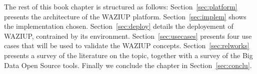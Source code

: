 The rest of this book chapter is structured as follows: Section~\ref{sec:platform} presents the architecture of the WAZIUP platform. 
Section~\ref{sec:implem} shows the implementation chosen. 
Section~\ref{sec:deploy} details the deployement of WAZIUP, contrained by its environment.
Section~\ref{sec:usecases} presents four use cases that will be used to validate the WAZIUP concepts.
Section~\ref{sec:relworks} presents a survey of the literature on the topic, together with a survey of the Big Data Open Source tools.
Finally we conclude the chapter in Section~\ref{sec:conclu}.
